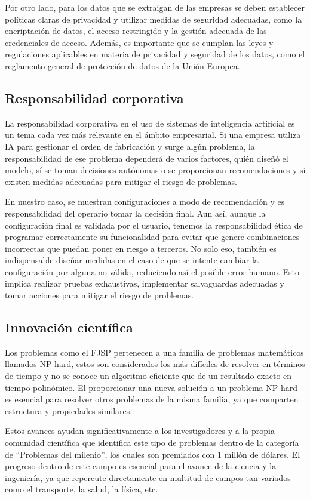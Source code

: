 Por otro lado, para los datos que se extraigan de las empresas se deben establecer 
políticas claras de privacidad y utilizar medidas de seguridad adecuadas, como 
la encriptación de datos, el acceso restringido y la gestión adecuada de las 
credenciales de acceso. Además, es importante que se cumplan las leyes y 
regulaciones aplicables en materia de privacidad y seguridad de los datos, como 
el reglamento general de protección de datos de la Unión Europea.\medskip

\subsection{Responsabilidad corporativa}
La responsabilidad corporativa en el uso de sistemas de inteligencia artificial 
es un tema cada vez más relevante en el ámbito empresarial. Si una empresa utiliza 
IA para gestionar el orden de fabricación y surge algún problema, la responsabilidad 
de ese problema dependerá de varios factores, quién diseñó el modelo, sí se toman 
decisiones autónomas o se proporcionan recomendaciones y si existen medidas adecuadas 
para mitigar el riesgo de problemas.\medskip

En nuestro caso, se muestran configuraciones a modo de recomendación y es responsabilidad 
del operario tomar la decisión final. Aun así, aunque la configuración final es validada 
por el usuario,  tenemos la responsabilidad ética de programar correctamente su funcionalidad 
para evitar que genere combinaciones incorrectas que puedan poner en riesgo a terceros. 
No solo eso, también es indispensable diseñar medidas en el caso de que se intente cambiar 
la configuración por alguna no válida, reduciendo así el posible error humano. Esto implica 
realizar pruebas exhaustivas, implementar salvaguardas adecuadas y tomar acciones para 
mitigar el riesgo de problemas. 

\subsection{Innovación científica}
Los problemas como el FJSP pertenecen a una familia de problemas matemáticos llamados NP-hard, 
estos son considerados los más difíciles de resolver en términos de tiempo y no se conoce un 
algoritmo eficiente que de un resultado exacto en tiempo polinómico. El proporcionar una nueva 
solución a un problema NP-hard es esencial para resolver otros problemas de la misma familia, 
ya que comparten estructura y propiedades similares.\medskip

Estos avances ayudan significativamente a los investigadores y a la propia comunidad científica 
que identifica este tipo de problemas dentro de la categoría de “Problemas del milenio”, los 
cuales son premiados con 1 millón de dólares. El progreso dentro de este campo es esencial para 
el avance de la ciencia y la ingeniería, ya que repercute directamente en multitud de campos tan 
variados como el transporte, la salud, la física, etc.

